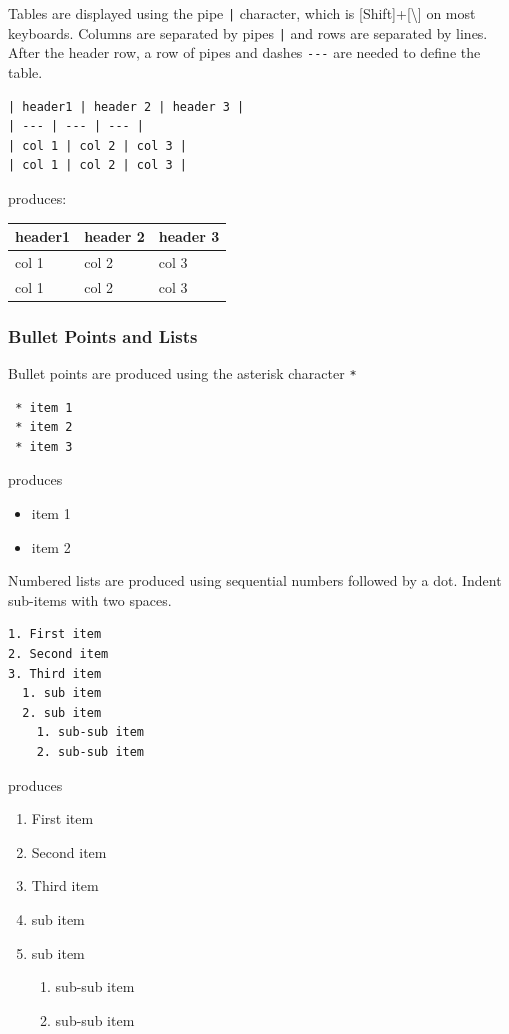 \documentclass{book}
\providecommand{\tightlist}{%
      \setlength{\itemsep}{0pt}\setlength{\parskip}{0pt}}
\begin{document}
Tables are displayed using the pipe \lstinline!|! character, which is
{[}Shift{]}+{[}\textbackslash{}{]} on most keyboards. Columns are
separated by pipes \lstinline!|! and rows are separated by lines. After
the header row, a row of pipes and dashes \lstinline!---! are needed to
define the table.

\begin{lstlisting}
| header1 | header 2 | header 3 |
| --- | --- | --- |
| col 1 | col 2 | col 3 |
| col 1 | col 2 | col 3 |
\end{lstlisting}

produces:

\begin{longtable}[]{@{}lll@{}}
\toprule
header1 & header 2 & header 3\tabularnewline
\midrule
\endhead
col 1 & col 2 & col 3\tabularnewline
col 1 & col 2 & col 3\tabularnewline
\bottomrule
\end{longtable}

\subsubsection{Bullet Points and Lists}\label{bullet-points-and-lists}

Bullet points are produced using the asterisk character \lstinline!*!

\begin{lstlisting}
 * item 1
 * item 2
 * item 3
\end{lstlisting}

produces

\begin{itemize}
\tightlist
\item
  item 1
\item
  item 2
\end{itemize}

Numbered lists are produced using sequential numbers followed by a dot.
Indent sub-items with two spaces.

\begin{lstlisting}
1. First item
2. Second item
3. Third item
  1. sub item
  2. sub item
    1. sub-sub item
    2. sub-sub item
\end{lstlisting}

produces

\begin{enumerate}
\def\labelenumi{\arabic{enumi}.}
\tightlist
\item
  First item
\item
  Second item
\item
  Third item
\item
  sub item
\item
  sub item

  \begin{enumerate}
  \def\labelenumii{\arabic{enumii}.}
  \tightlist
  \item
    sub-sub item
  \item
    sub-sub item
  \end{enumerate}
\end{enumerate}
\end{document}
